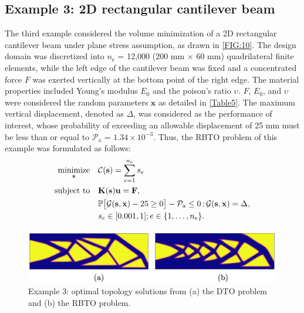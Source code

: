 \documentclass[preprint,3p]{elsarticle}
\begin{document}
\begin{linenumbers}
\subsection{Example 3: 2D rectangular cantilever beam}\label{SUBSEC:43}
The third example considered the volume minimization of a 2D rectangular cantilever beam under plane stress assumption, as drawn in \cref{FIG:10}. The design domain was discretized into $n_\text{e}$ = 12,000 (200 mm $\times$ 60 mm) quadrilateral finite elements, while the left edge of the cantilever beam was fixed and a concentrated force $F$ was exerted vertically at the bottom point of the right edge. The material properties included Young’s modulus $E_0$ and the poison’s ratio $\upsilon$. $F$, $E_0$, and $\upsilon$ were considered the random parameters $\textbf{x}$ as detailed in \cref{Table5}. The maximum vertical displacement, denoted as $\Delta$, was considered as the performance of interest, whose probability of exceeding an allowable displacement of 25 mm must be less than or equal to $\mathcal{P}_\text{a}$ = $1.34\times10^{-3}$. Thus, the RBTO problem of this example was formulated as follows:
\begin{equation}
    \begin{aligned}
        \underset{\textbf{s}}{\text{minimize}} \quad & \mathcal{C}(\textbf{s}) = \displaystyle\sum_{e=1}^{n_\text{e}} s_e\\
        \text{subject to} \quad &
        {\bf K(s)}{\bf u}={\bf F},\\
        & \mathbb{P}\bigl[\mathcal{G}(\textbf{s},\textbf{x})-25 \geq 0 \bigr]-\mathcal{P}_{\text{a}} \leq 0 \,; \mathcal{G}(\textbf{s},\textbf{x}) = \Delta,\\
        &s_e \in [0.001,1]; e \in \{1,\dots,n_\text{e}\}.
    \end{aligned}
    \label{EQ:28}
\end{equation}

\begin{figure}[t]
	\begin{center}
		\includegraphics[scale=1.2]{Fig11.jpg}
	\end{center}
	\caption{Example 3: optimal topology solutions from (a) the DTO problem and (b) the RBTO problem.}
	\label{FIG:11}
\end{figure}


\end{linenumbers}
\end{document}
